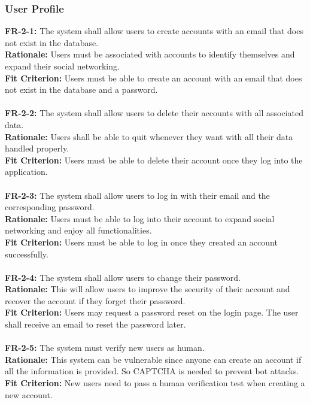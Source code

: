 \documentclass[12pt]{article}
\begin{document}
\subsubsection{User Profile}
    \textbf{FR-2-1:} The system shall allow users to create accounts with an email that does not exist in the database.\\
    \textbf{Rationale:} Users must be associated with accounts to identify themselves and expand their social networking.\\
    \textbf{Fit Criterion:} Users must be able to create an account with an email that does not exist in the database and a password.\\\\
    \textbf{FR-2-2:} The system shall allow users to delete their accounts with all associated data.\\
    \textbf{Rationale:} Users shall be able to quit whenever they want with all their data handled properly.\\
    \textbf{Fit Criterion:} Users must be able to delete their account once they log into the application.\\\\
    \textbf{FR-2-3:} The system shall allow users to log in with their email and the corresponding password.\\
    \textbf{Rationale:} Users must be able to log into their account to expand social networking and enjoy all functionalities.\\
    \textbf{Fit Criterion:} Users must be able to log in once they created an account successfully.\\\\
    \textbf{FR-2-4:} The system shall allow users to change their password.\\
    \textbf{Rationale:} This will allow users to improve the security of their account and recover the account if they forget their password.\\
    \textbf{Fit Criterion:} Users may request a password reset on the login page. The user shall receive an email to reset the password later.\\\\
    \textbf{FR-2-5:} The system must verify new users as human.\\
    \textbf{Rationale:} This system can be vulnerable since anyone can create an account if all the information is provided. So CAPTCHA is needed to prevent bot attacks.\\
    \textbf{Fit Criterion:} New users need to pass a human verification test when creating a new account.\\\\
\end{document}
